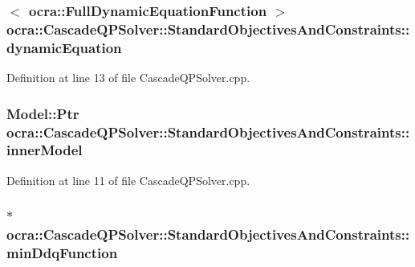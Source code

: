 \subsubsection[{\texorpdfstring{dynamic\+Equation}{dynamicEquation}}]{$<$ {\bf ocra\+::\+Full\+Dynamic\+Equation\+Function} $>$ ocra\+::\+Cascade\+Q\+P\+Solver\+::\+Standard\+Objectives\+And\+Constraints\+::dynamic\+Equation}\hypertarget{structocra_1_1CascadeQPSolver_1_1StandardObjectivesAndConstraints_a31b476355775f3c5ec5caf75722325b4}{}\label{structocra_1_1CascadeQPSolver_1_1StandardObjectivesAndConstraints_a31b476355775f3c5ec5caf75722325b4}


Definition at line 13 of file Cascade\+Q\+P\+Solver.\+cpp.

\subsubsection[{\texorpdfstring{inner\+Model}{innerModel}}]{\setlength{\rightskip}{0pt plus 5cm}Model\+::\+Ptr ocra\+::\+Cascade\+Q\+P\+Solver\+::\+Standard\+Objectives\+And\+Constraints\+::inner\+Model}\hypertarget{structocra_1_1CascadeQPSolver_1_1StandardObjectivesAndConstraints_afef3efb83bcd601ec3fb552baf7c5a22}{}\label{structocra_1_1CascadeQPSolver_1_1StandardObjectivesAndConstraints_afef3efb83bcd601ec3fb552baf7c5a22}


Definition at line 11 of file Cascade\+Q\+P\+Solver.\+cpp.

\subsubsection[{\texorpdfstring{min\+Ddq\+Function}{minDdqFunction}}]{$\ast$ ocra\+::\+Cascade\+Q\+P\+Solver\+::\+Standard\+Objectives\+And\+Constraints\+::min\+Ddq\+Function}\hypertarget{structocra_1_1CascadeQPSolver_1_1StandardObjectivesAndConstraints_aecb4a6afb7cc5eb348017a0cfdf9e0ca}{}\label{structocra_1_1CascadeQPSolver_1_1StandardObjectivesAndConstraints_aecb4a6afb7cc5eb348017a0cfdf9e0ca}


